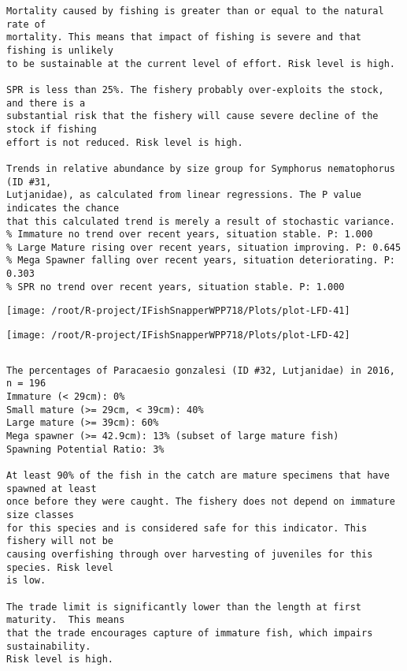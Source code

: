 \documentclass{report}\usepackage[]{graphicx}\usepackage[]{color}
\makeatletter
\def\maxwidth{ %
  \ifdim\Gin@nat@width>\linewidth
    \linewidth
  \else
    \Gin@nat@width
  \fi
}
\newenvironment{kframe}{%
 \def\at@end@of@kframe{}%
 \ifinner\ifhmode%
  \def\at@end@of@kframe{\end{minipage}}%
  \begin{minipage}{\columnwidth}%
 \fi\fi%
 \def\FrameCommand##1{\hskip\@totalleftmargin \hskip-\fboxsep
 \colorbox{shadecolor}{##1}\hskip-\fboxsep
     \hskip-\linewidth \hskip-\@totalleftmargin \hskip\columnwidth}%
 \MakeFramed {\advance\hsize-\width
   \@totalleftmargin\z@ \linewidth\hsize
   \@setminipage}}%
 {\par\unskip\endMakeFramed%
 \at@end@of@kframe}
\newenvironment{knitrout}{}{} %
\makeatother
\begin{document}
\begin{knitrout}
\begin{kframe}
\begin{verbatim}
Mortality caused by fishing is greater than or equal to the natural rate of
mortality. This means that impact of fishing is severe and that fishing is unlikely
to be sustainable at the current level of effort. Risk level is high.
 
SPR is less than 25%. The fishery probably over-exploits the stock, and there is a
substantial risk that the fishery will cause severe decline of the stock if fishing
effort is not reduced. Risk level is high.
 
Trends in relative abundance by size group for Symphorus nematophorus (ID #31,
Lutjanidae), as calculated from linear regressions. The P value indicates the chance
that this calculated trend is merely a result of stochastic variance.
% Immature no trend over recent years, situation stable. P: 1.000
% Large Mature rising over recent years, situation improving. P: 0.645
% Mega Spawner falling over recent years, situation deteriorating. P: 0.303
% SPR no trend over recent years, situation stable. P: 1.000
\end{verbatim}
\end{kframe}
\texttt{[image: /root/R-project/IFishSnapperWPP718/Plots/plot-LFD-41]} 

\texttt{[image: /root/R-project/IFishSnapperWPP718/Plots/plot-LFD-42]} 
\begin{kframe}\begin{verbatim}
\end{verbatim}
\end{kframe}
\clearpage
\newpage
\begin{kframe}\begin{verbatim}The percentages of Paracaesio gonzalesi (ID #32, Lutjanidae) in 2016, n = 196
Immature (< 29cm): 0%
Small mature (>= 29cm, < 39cm): 40%
Large mature (>= 39cm): 60%
Mega spawner (>= 42.9cm): 13% (subset of large mature fish)
Spawning Potential Ratio: 3%
 
At least 90% of the fish in the catch are mature specimens that have spawned at least
once before they were caught. The fishery does not depend on immature size classes
for this species and is considered safe for this indicator. This fishery will not be
causing overfishing through over harvesting of juveniles for this species. Risk level
is low.

The trade limit is significantly lower than the length at first maturity.  This means
that the trade encourages capture of immature fish, which impairs sustainability.
Risk level is high.


\end{verbatim}
\end{kframe}
\end{knitrout}
\end{document}
